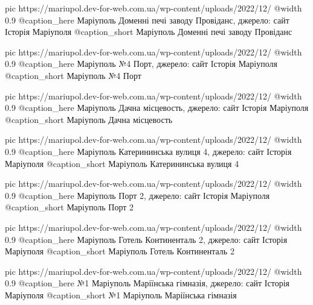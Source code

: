 	pic https://mariupol.dev-for-web.com.ua/wp-content/uploads/2022/12/%
	@width 0.9
	@caption_here Маріуполь Доменні печі заводу Провіданс, джерело: сайт Історія Маріуполя
	@caption_short Маріуполь Доменні печі заводу Провіданс

	pic https://mariupol.dev-for-web.com.ua/wp-content/uploads/2022/12/%
	@width 0.9
	@caption_here Маріуполь №4 Порт, джерело: сайт Історія Маріуполя
	@caption_short Маріуполь №4 Порт

	pic https://mariupol.dev-for-web.com.ua/wp-content/uploads/2022/12/%
	@width 0.9
	@caption_here Маріуполь Дачна місцевость, джерело: сайт Історія Маріуполя
	@caption_short Маріуполь Дачна місцевость

	pic https://mariupol.dev-for-web.com.ua/wp-content/uploads/2022/12/%
	@width 0.9
	@caption_here Маріуполь Катерининська вулиця 4, джерело: сайт Історія Маріуполя
	@caption_short Маріуполь Катерининська вулиця 4

	pic https://mariupol.dev-for-web.com.ua/wp-content/uploads/2022/12/%
	@width 0.9
	@caption_here Маріуполь Порт 2, джерело: сайт Історія Маріуполя
	@caption_short Маріуполь Порт 2

	pic https://mariupol.dev-for-web.com.ua/wp-content/uploads/2022/12/%
	@width 0.9
	@caption_here Маріуполь Готель Континенталь 2, джерело: сайт Історія Маріуполя
	@caption_short Маріуполь Готель Континенталь 2

	pic https://mariupol.dev-for-web.com.ua/wp-content/uploads/2022/12/%
	@width 0.9
	@caption_here №1 Маріуполь Маріїнська гімназія, джерело: сайт Історія Маріуполя
	@caption_short №1 Маріуполь Маріїнська гімназія


